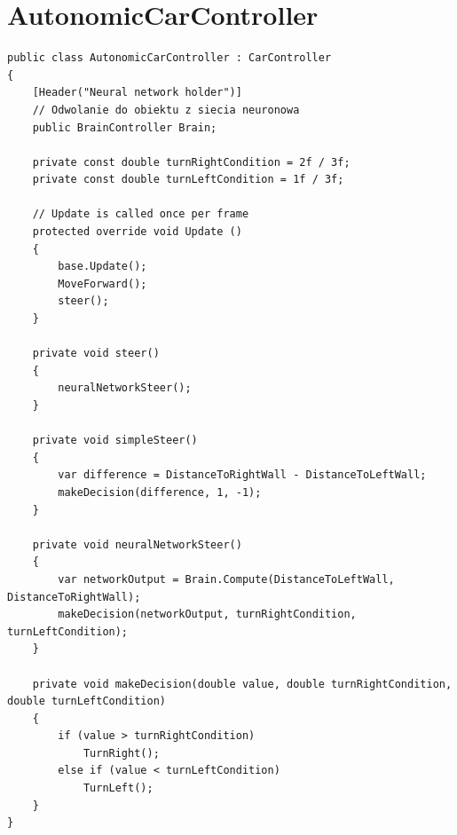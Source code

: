 \documentclass[12pt,a4paper]{article}
\begin{document}
	\section*{AutonomicCarController}
	\begin{lstlisting}
public class AutonomicCarController : CarController
{
    [Header("Neural network holder")]
    // Odwolanie do obiektu z siecia neuronowa
    public BrainController Brain;

    private const double turnRightCondition = 2f / 3f;
    private const double turnLeftCondition = 1f / 3f;

    // Update is called once per frame
    protected override void Update ()
    {
        base.Update();
        MoveForward();
        steer();
	}

    private void steer()
    {
        neuralNetworkSteer();
    }

    private void simpleSteer()
    {
        var difference = DistanceToRightWall - DistanceToLeftWall;
        makeDecision(difference, 1, -1);
    }

    private void neuralNetworkSteer()
    {
        var networkOutput = Brain.Compute(DistanceToLeftWall, DistanceToRightWall);
        makeDecision(networkOutput, turnRightCondition, turnLeftCondition);
    }

    private void makeDecision(double value, double turnRightCondition, double turnLeftCondition)
    {
        if (value > turnRightCondition)
            TurnRight();
        else if (value < turnLeftCondition)
            TurnLeft();
    }
}
	\end{lstlisting}
	
\end{document}
